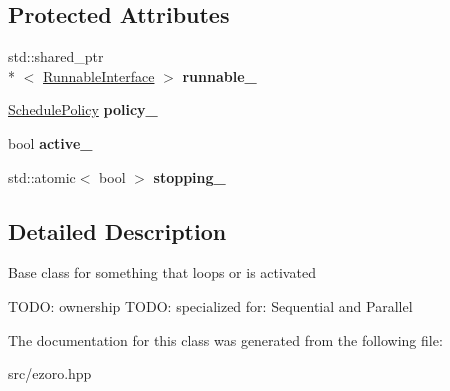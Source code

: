 \subsection*{Protected Attributes}
\begin{DoxyCompactItemize}
\item 
\hypertarget{classcoco_1_1_activity_a5f2a9c45be825f79905581e237b1bcbd}{std\-::shared\-\_\-ptr\\*
$<$ \hyperlink{classcoco_1_1_runnable_interface}{Runnable\-Interface} $>$ {\bfseries runnable\-\_\-}}\label{classcoco_1_1_activity_a5f2a9c45be825f79905581e237b1bcbd}

\item 
\hypertarget{classcoco_1_1_activity_a75a9fe827a532ab36696487b0ca3d166}{\hyperlink{structcoco_1_1_schedule_policy}{Schedule\-Policy} {\bfseries policy\-\_\-}}\label{classcoco_1_1_activity_a75a9fe827a532ab36696487b0ca3d166}

\item 
\hypertarget{classcoco_1_1_activity_aef80c256f45b789d987673a4f350907e}{bool {\bfseries active\-\_\-}}\label{classcoco_1_1_activity_aef80c256f45b789d987673a4f350907e}

\item 
\hypertarget{classcoco_1_1_activity_ac7e15c803c0f74c88ac5ae1f489ee9f3}{std\-::atomic$<$ bool $>$ {\bfseries stopping\-\_\-}}\label{classcoco_1_1_activity_ac7e15c803c0f74c88ac5ae1f489ee9f3}

\end{DoxyCompactItemize}


\subsection{Detailed Description}
Base class for something that loops or is activated

T\-O\-D\-O\-: ownership T\-O\-D\-O\-: specialized for\-: Sequential and Parallel 

The documentation for this class was generated from the following file\-:\begin{DoxyCompactItemize}
\item 
src/ezoro.\-hpp\end{DoxyCompactItemize}
